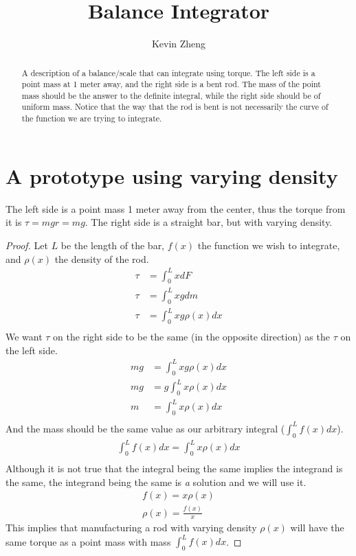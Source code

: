 \documentclass[letterpaper, 12pt]{article}
\title{Balance Integrator}
\author{Kevin Zheng}
\begin{document}
\maketitle
\begin{abstract}
	\par A description of a balance/scale that can integrate using torque.
	The left side is a point mass at 1 meter away, and the right side is a bent rod.
	The mass of the point mass should be the answer to the definite integral, while the right side should be of uniform mass. Notice that the way that the rod is bent is not necessarily the curve of the function we are trying to integrate.
\end{abstract}
\tableofcontents
\section{A prototype using varying density}
\par The left side is a point mass 1 meter away from the center, thus the torque from it is $\tau = mgr = mg$.
The right side is a straight bar, but with varying density.
\begin{center}
\end{center}
\begin{proof}
	Let $L$ be the length of the bar, $f(x)$ the function we wish to integrate, and $\rho(x)$ the density of the rod.
	\begin{align*}
		\tau &= \int_0^L xdF\\
		\tau &= \int_0^L xgdm\\
		\tau &= \int_0^L xg\rho(x)dx\\
	\end{align*}
	We want $\tau$ on the right side to be the same (in the opposite direction) as the $\tau$ on the left side.
	\begin{align*}
		mg &= \int_0^L xg\rho(x)dx\\
		mg &= g\int_0^L x\rho(x)dx\\
		m &= \int_0^L x\rho(x)dx\\
	\end{align*}
	And the mass should be the same value as our arbitrary integral ($\int_0^Lf(x)dx$).
	\begin{align*}
		\int_0^Lf(x)dx = \int_0^L x\rho(x)dx\\
	\end{align*}
	Although it is not true that the integral being the same implies the integrand is the same, the integrand being the same is \emph{a} solution and we will use it.
	\begin{align*}
		f(x) = x\rho(x)\\
		\rho(x) = \frac{f(x)}{x}
	\end{align*}
	This implies that manufacturing a rod with varying density $\rho(x)$ will have the same torque as a point mass with mass $\int_0^L f(x) dx$.
\end{proof}
\end{document}
